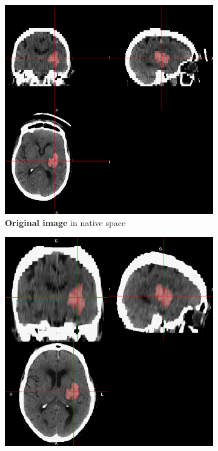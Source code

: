 \documentclass[final]{beamer}\usepackage[]{graphicx}\usepackage[]{color}
\begin{document}
\begin{frame}[fragile]
\begin{multicols}{2}
\begin{figure}[htbp]
 \begin{subfigure}[t]{0.25\linewidth} 
  \includegraphics[width=\linewidth]{native_191-375_20100410_0404_CT_2_CT_STANDARD.png}
  \caption{\textbf{Original image} in native space}
 \label{reg:nat2}
  \end{subfigure}
 \begin{subfigure}[t]{0.25\linewidth} 
  \includegraphics[width=\linewidth]{raw_spm_191-375_20100410_0404_CT_2_CT_STANDARD.png}

\end{subfigure}
\end{figure}
\end{multicols}
\end{frame}
\end{document}
